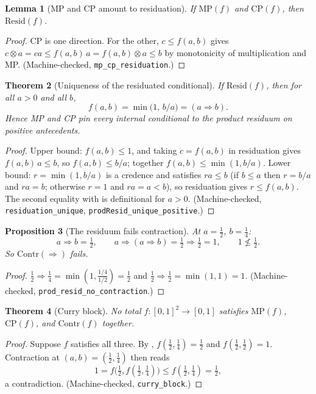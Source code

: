 \documentclass[11pt,a4paper]{article}
\newtheorem{theorem}{Theorem}[section]
\newtheorem{lemma}[theorem]{Lemma}
\newtheorem{proposition}[theorem]{Proposition}
\newcommand{\conjc}{\otimes}
\begin{document}
\begin{lemma}[MP and CP amount to residuation]
\label{lem:mp-cp-resid}
If $\mathrm{MP}(f)$ and $\mathrm{CP}(f)$, then $\mathrm{Resid}(f)$.
\end{lemma}
\begin{proof}
CP is one direction.
For the other, $c \leq f(a,b)$ gives
$c \conjc a = ca \leq f(a,b)\,a = f(a,b) \conjc a \leq b$ by
monotonicity of multiplication and MP.
(Machine-checked, \texttt{mp\_cp\_residuation}.)
\end{proof}

\begin{theorem}[Uniqueness of the residuated conditional]
\label{thm:resid-unique}
If $\mathrm{Resid}(f)$, then for all $a > 0$ and all $b$,
\[
  f(a,b) = \min\!\bigl(1,\, b/a\bigr) = (a \Rightarrow b).
\]
Hence MP and CP pin every internal conditional to the product residuum
on positive antecedents.
\end{theorem}
\begin{proof}
Upper bound: $f(a,b) \leq 1$, and taking $c = f(a,b)$ in residuation
gives $f(a,b)\,a \leq b$, so $f(a,b) \leq b/a$; together
$f(a,b) \leq \min(1, b/a)$.
Lower bound: $r = \min(1, b/a)$ is a credence and satisfies
$r a \leq b$ (if $b \leq a$ then $r = b/a$ and $ra = b$; otherwise
$r = 1$ and $ra = a < b$), so residuation gives $r \leq f(a,b)$.
The second equality with  is definitional for
$a > 0$.
(Machine-checked, \texttt{residuation\_unique},
\texttt{prodResid\_unique\_positive}.)
\end{proof}

\begin{proposition}[The residuum fails contraction]
\label{prop:no-contraction}
At $a = \tfrac12$, $b = \tfrac14$:
\[
  a \Rightarrow b = \tfrac12,
  \qquad
  a \Rightarrow (a \Rightarrow b) = \tfrac12 \Rightarrow \tfrac12 = 1,
  \qquad
  1 \not\leq \tfrac12 .
\]
So $\mathrm{Contr}(\Rightarrow)$ fails.
\end{proposition}
\begin{proof}
$\tfrac12 \Rightarrow \tfrac14 = \min(1, \tfrac{1/4}{1/2}) = \tfrac12$
and
$\tfrac12 \Rightarrow \tfrac12 = \min(1, 1) = 1$.
(Machine-checked, \texttt{prod\_resid\_no\_contraction}.)
\end{proof}

\begin{theorem}[Curry block]
\label{thm:curry-block}
No total $f : [0,1]^2 \to [0,1]$ satisfies $\mathrm{MP}(f)$,
$\mathrm{CP}(f)$, and $\mathrm{Contr}(f)$ together.
\end{theorem}
\begin{proof}
Suppose $f$ satisfies all three.
By ,
$f(\tfrac12, \tfrac14) = \tfrac12$ and
$f(\tfrac12, \tfrac12) = 1$.
Contraction at $(a,b) = (\tfrac12, \tfrac14)$ then reads
\[
  1 = f\bigl(\tfrac12, f(\tfrac12,\tfrac14)\bigr)
    \leq f(\tfrac12, \tfrac14) = \tfrac12,
\]
a contradiction.
(Machine-checked, \texttt{curry\_block}.)
\end{proof}
\end{document}
